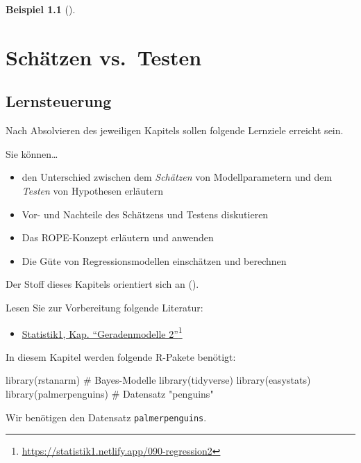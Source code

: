 \documentclass[
  ngerman,
  letterpaper,
  twoside,
  open=any]{scrbook}
\newenvironment{Shaded}{\begin{snugshade}}{\end{snugshade}}
\newcommand{\CommentTok}[1]{\textcolor[rgb]{0.37,0.37,0.37}{#1}}
\newcommand{\FunctionTok}[1]{\textcolor[rgb]{0.28,0.35,0.67}{#1}}
\newcommand{\NormalTok}[1]{\textcolor[rgb]{0.00,0.23,0.31}{#1}}
\providecommand{\tightlist}{%
  \setlength{\itemsep}{0pt}\setlength{\parskip}{0pt}}\usepackage{longtable,booktabs,array}
\theoremstyle{definition}
\newtheorem{example}{Beispiel}[chapter]
\theoremstyle{plain}
\theoremstyle{definition}
\theoremstyle{definition}
\theoremstyle{remark}
\begin{document}
\begin{example}[]
\chapter{Schätzen vs.~Testen}\label{schuxe4tzen-vs.-testen}

\section{Lernsteuerung}\label{lernsteuerung-9}

Nach Absolvieren des jeweiligen Kapitels sollen folgende Lernziele
erreicht sein.

Sie können\ldots{}

\begin{itemize}
\tightlist
\item
  den Unterschied zwischen dem \emph{Schätzen} von Modellparametern und
  dem \emph{Testen} von Hypothesen erläutern
\item
  Vor- und Nachteile des Schätzens und Testens diskutieren
\item
  Das ROPE-Konzept erläutern und anwenden
\item
  Die Güte von Regressionsmodellen einschätzen und berechnen
\end{itemize}

Der Stoff dieses Kapitels orientiert sich an
().

Lesen Sie zur Vorbereitung folgende Literatur:

\begin{itemize}
\tightlist
\item
  \href{https://statistik1.netlify.app/090-regression2}{Statistik1, Kap.
  \enquote{Geradenmodelle 2}}\footnote{\url{https://statistik1.netlify.app/090-regression2}}
\end{itemize}

In diesem Kapitel werden folgende R-Pakete benötigt:

\begin{Shaded}
\begin{Highlighting}[]
\FunctionTok{library}\NormalTok{(rstanarm)   }\CommentTok{\# Bayes{-}Modelle}
\FunctionTok{library}\NormalTok{(tidyverse)}
\FunctionTok{library}\NormalTok{(easystats)}
\FunctionTok{library}\NormalTok{(palmerpenguins)  }\CommentTok{\# Datensatz "penguins"}
\end{Highlighting}
\end{Shaded}

Wir benötigen den Datensatz \texttt{palmerpenguins}.


\end{example}
\end{document}
